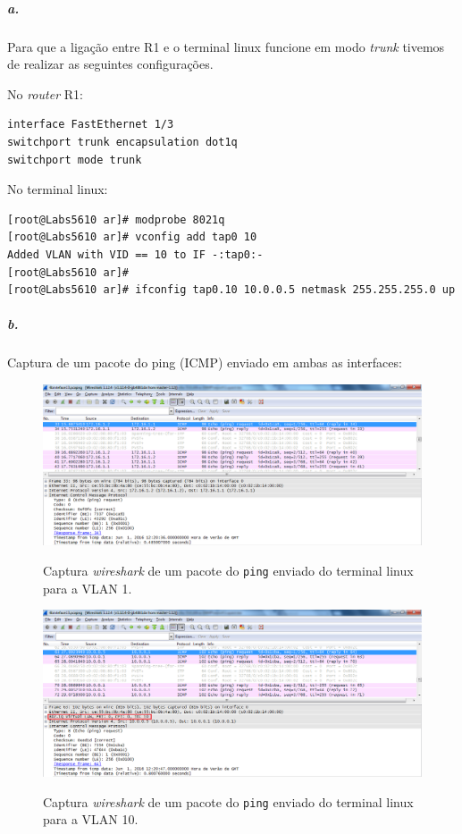 \subparagraph{a.}
Para que a ligação entre \textsf{R1} e o terminal \textsf{linux} funcione em modo \emph{trunk} tivemos de realizar as seguintes configurações.

No \emph{router} \textsf{R1}:
\begin{verbatim}
interface FastEthernet 1/3
switchport trunk encapsulation dot1q
switchport mode trunk
\end{verbatim}

No terminal \textsf{linux}:
\begin{verbatim}
[root@Labs5610 ar]# modprobe 8021q
[root@Labs5610 ar]# vconfig add tap0 10
Added VLAN with VID == 10 to IF -:tap0:-
[root@Labs5610 ar]# 
[root@Labs5610 ar]# ifconfig tap0.10 10.0.0.5 netmask 255.255.255.0 up
\end{verbatim}

\newpage

\subparagraph{b.}
Captura de um pacote do \textsf{ping} (ICMP) enviado em ambas as interfaces:

\begin{figure}[h]
\centering
\includegraphics[width=1\textwidth, height=0.32\textheight]{4_ping_VLAN1.png}
\label{fig:5-capturaWireshark}
\caption{Captura \emph{wireshark} de um pacote do \texttt{ping} enviado do terminal \textsf{linux} para a \textsf{VLAN 1}.}
\end{figure}

\begin{figure}[h]
\centering
\includegraphics[width=1\textwidth, height=0.32\textheight]{4_ping_VLAN10.png}
\label{fig:6-capturaWireshark}
\caption{Captura \emph{wireshark} de um pacote do \texttt{ping} enviado do terminal \textsf{linux} para a \textsf{VLAN 10}.}
\end{figure}


